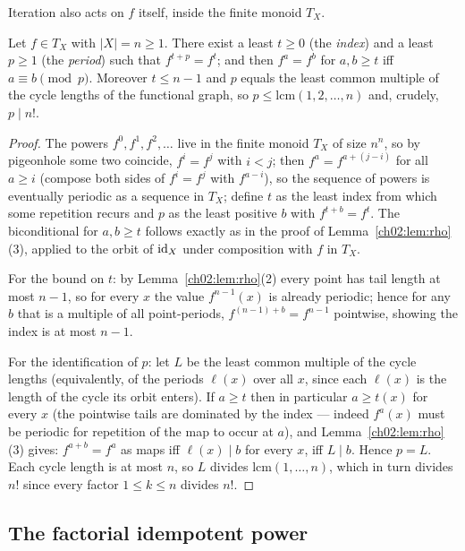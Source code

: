 Iteration also acts on $f$ itself, inside the finite monoid $T_X$.

\begin{theorem}\label{ch02:thm:index-period}
Let $f \in T_X$ with $|X| = n \geq 1$. There exist a least
$t \geq 0$ (the \emph{index}) and a least $p \geq 1$ (the \emph{period})
such that $f^{t + p} = f^{t}$; and then $f^{a} = f^{b}$ for
$a, b \geq t$ iff $a \equiv b \pmod p$. Moreover $t \leq n - 1$ and $p$
equals the least common multiple of the cycle lengths of the functional
graph, so $p \leq \mathrm{lcm}(1, 2, \dots, n)$ and, crudely,
$p \mid n!$.
\end{theorem}

\begin{proof}
The powers $f^0, f^1, f^2, \dots$ live in the finite monoid $T_X$ of size
$n^n$, so by pigeonhole some two coincide, $f^{i} = f^{j}$ with $i < j$;
then $f^{a} = f^{a + (j - i)}$ for all $a \geq i$ (compose both sides of
$f^i = f^j$ with $f^{a-i}$), so the sequence of powers is eventually
periodic as a sequence in $T_X$; define $t$ as the least index from which
some repetition recurs and $p$ as the least positive $b$ with
$f^{t+b} = f^t$. The biconditional for $a, b \geq t$ follows exactly as in
the proof of Lemma~\ref{ch02:lem:rho}(3), applied to the orbit of
$\mathrm{id}_X$ under composition with $f$ in $T_X$.

For the bound on $t$: by Lemma~\ref{ch02:lem:rho}(2) every point has tail
length at most $n - 1$, so for every $x$ the value $f^{n-1}(x)$ is already
periodic; hence for any $b$ that is a multiple of all point-periods,
$f^{(n-1) + b} = f^{n-1}$ pointwise, showing the index is at most
$n - 1$.

For the identification of $p$: let $L$ be the least common multiple of the
cycle lengths (equivalently, of the periods $\ell(x)$ over all $x$, since
each $\ell(x)$ is the length of the cycle its orbit enters). If
$a \geq t$ then in particular $a \geq t(x)$ for every $x$ (the pointwise
tails are dominated by the index --- indeed $f^a(x)$ must be periodic for
repetition of the map to occur at $a$), and
Lemma~\ref{ch02:lem:rho}(3) gives: $f^{a + b} = f^{a}$ as maps iff
$\ell(x) \mid b$ for every $x$, iff $L \mid b$. Hence $p = L$. Each cycle
length is at most $n$, so $L$ divides $\mathrm{lcm}(1, \dots, n)$, which in
turn divides $n!$ since every factor $1 \le k \le n$ divides $n!$.
\end{proof}

\subsection{The factorial idempotent power}

